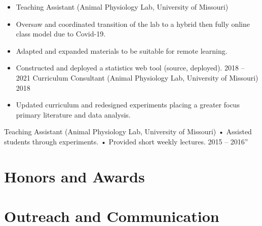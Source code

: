 \documentclass[10pt,a4paper,]{twentysecondcv}
\begin{document}
\begin{itemize}
\item
  Teaching Assistant (Animal Physiology Lab, University of Missouri)
\item
  Oversaw and coordinated transition of the lab to a hybrid then fully
  online class model due to Covid-19.
\item
  Adapted and expanded materials to be suitable for remote learning.
\item
  Constructed and deployed a statistics web tool (source, deployed).
  2018 -- 2021 Curriculum Consultant (Animal Physiology Lab, University
  of Missouri) 2018
\item
  Updated curriculum and redesigned experiments placing a greater focus
  primary literature and data analysis.
\end{itemize}

Teaching Assistant (Animal Physiology Lab, University of Missouri) •
Assisted students through experiments. • Provided short weekly lectures.
2015 -- 2016''

\hypertarget{honors-and-awards}{%
\section{Honors and Awards}\label{honors-and-awards}}

\nopagebreak

\begin{twenty}
\end{twenty}

\hypertarget{outreach-and-communication}{%
\section{Outreach and Communication}\label{outreach-and-communication}}

\nopagebreak
\end{document}
